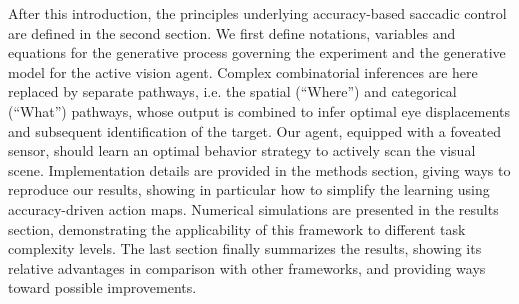 After this introduction, the principles underlying accuracy-based saccadic control are defined in the second section. We first define notations, variables and equations for the generative process governing the experiment and the generative model for the active vision agent.
Complex combinatorial inferences are here replaced by separate pathways, i.e. the spatial (``Where'') and categorical (``What'') pathways, whose output is combined to infer optimal eye displacements and subsequent identification of the target. Our agent, equipped with a foveated sensor, should learn an optimal behavior strategy to actively scan the visual scene. Implementation details are provided in the methods section, giving ways to reproduce our results,  showing in particular how to simplify the learning using accuracy-driven action maps. Numerical simulations are presented in the results section, demonstrating the applicability of this framework to different task complexity levels. %
The last section finally summarizes the results, showing its relative advantages in comparison with other frameworks, and providing ways toward possible improvements.


